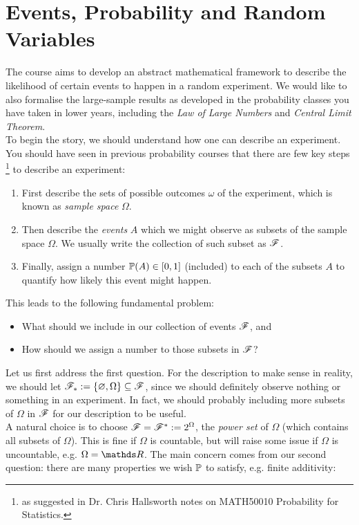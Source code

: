 \section{Events, Probability and Random Variables}
The course aims to develop an abstract mathematical framework to describe the likelihood of certain events to happen in a random experiment. We would like to also formalise the large-sample results as developed in the probability classes you have taken in lower years, including the \textit{Law of Large Numbers} and \textit{Central Limit Theorem}.\\

To begin the story, we should understand how one can describe an experiment. You should have seen in previous probability courses that there are few key steps \footnote{as suggested in Dr. Chris Hallsworth notes on MATH50010 Probability for Statistics.} to describe an experiment:
\begin{enumerate}
    \item First describe the sets of possible outcomes $\omega$ of the experiment, which is known as \textit{sample space} $\Omega$. 
    \item Then describe the \textit{events} $A$ which we might observe as subsets of the sample space $\Omega$. We usually write the collection of such subset as $\mathcal{F}$. 
    \item Finally, assign a number $\mathbb{P}(A) \in [0,1]$ (included) to each of the subsets $A$ to quantify how likely this event might happen.
\end{enumerate}

This leads to the following fundamental problem:
\begin{itemize}
    \item What should we include in our collection of events $\mathcal{F}$, and
    \item How should we assign a number to those subsets in $\mathcal{F}$?
\end{itemize}

Let us first address the first question. For the description to make sense in reality, we should let $\mathcal{F}_* := \left\{ \varnothing, \Omega \right \} \subseteq \mathcal{F}$, since we should definitely observe nothing or something in an experiment. In fact, we should probably including more subsets of $\Omega$ in $\mathcal{F}$ for our description to be useful. \\

A natural choice is to choose $\mathcal{F} = \mathcal{F}^* := 2^\Omega$, the \textit{power set} of $\Omega$ (which contains all subsets of $\Omega$). This is fine if $\Omega$ is countable, but will raise some issue if $\Omega$ is uncountable, e.g. $\Omega = \R$. The main concern comes from our second question: there are many properties we wish $\mathbb{P}$ to satisfy, e.g.  finite additivity: 

